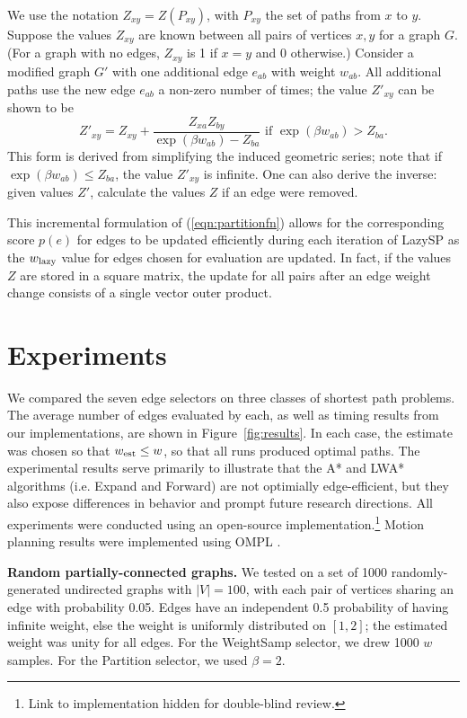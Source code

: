 \documentclass[nobib]{tufte-book}
\newcommand{\ms}[1]{\mbox{\scriptsize #1}}
\begin{document}
We use the notation $Z_{xy} = Z(P_{xy})$,
with $P_{xy}$ the set of paths from $x$ to $y$.
Suppose the values $Z_{xy}$ are known between
all pairs of vertices $x, y$ for a graph $G$.
(For a graph with no edges,
$Z_{xy}$ is 1 if $x = y$ and 0 otherwise.)
Consider a modified graph $G'$ with one additional edge $e_{ab}$
with weight $w_{ab}$.
All additional paths use the new edge $e_{ab}$ a non-zero
number of times;
the value $Z'_{xy}$ can be shown to be
\begin{equation}
   Z'_{xy} = Z_{xy} + \frac{Z_{xa} Z_{by}}{\exp(\beta w_{ab}) - Z_{ba}}
   \mbox{ if }
   \exp(\beta w_{ab}) > Z_{ba}.
\end{equation}
This form is derived from simplifying the induced geometric series;
note that if $\exp(\beta w_{ab})  \leq Z_{ba}$,
the value $Z'_{xy}$ is infinite.
One can also derive the inverse:
given values $Z'$,
calculate the values $Z$ if an edge were removed.

This incremental formulation of (\ref{eqn:partitionfn})
allows for the corresponding score $p(e)$ for edges
to be updated efficiently during each iteration of LazySP as
the $w_{\ms{lazy}}$ value for edges chosen for evaluation are updated.
In fact,
if the values $Z$ are stored in a square matrix,
the update for all pairs after an edge weight change consists of a single
vector outer product.

\section{Experiments}

We compared the seven edge selectors on three classes of shortest path
problems.
The average number of edges evaluated by each,
as well as timing results from our implementations,
are shown in Figure~\ref{fig:results}.
In each case,
the estimate was chosen so that $w_{\ms{est}} \leq w$,
so that all runs produced optimal paths.
The experimental results serve primarily to illustrate that
the A* and LWA* algorithms
(i.e. Expand and Forward)
are not optimially edge-efficient,
but they also expose differences in behavior and prompt
future research directions.
All experiments were conducted using an open-source
implementation.\footnote{%
Link to implementation hidden for double-blind review.
}
Motion planning results were implemented using
OMPL \citep{sucan2012ompl}.

\textbf{Random partially-connected graphs.}
We tested on a set of 1000 randomly-generated undirected graphs
with $|V|=100$,
with each pair of vertices sharing an edge with probability 0.05.
Edges have an independent 0.5 probability of having infinite weight,
else the weight is uniformly distributed on $[1,2]$;
the estimated weight was unity for all edges.
For the WeightSamp selector,
we drew 1000 $w$ samples.
For the Partition selector, we used $\beta = 2$.
\end{document}
